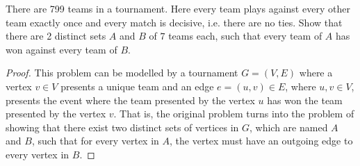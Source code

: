 \begin{problem}
  There are 799 teams in a tournament. Here every team plays against every other team exactly once and every match is decisive, i.e. there are no ties. Show that there are 2 distinct sets $A$ and $B$ of $7$ teams each, such that every team of $A$ has won against every team of $B$.
\end{problem}
\begin{proof}
  This problem can be modelled by a tournament $G=(V,E)$ where a vertex $v \in V$ presents a unique team and an edge $e=(u,v) \in E$, where $u,v \in V$, presents the event where the team presented by the vertex $u$ has won the team presented by the vertex $v$. That is, the original problem turns into the problem of showing that there exist two distinct sets of vertices in $G$, which are named $A$ and $B$, such that for every vertex in $A$, the vertex must have an outgoing edge to every vertex in $B$. 


\end{proof}

